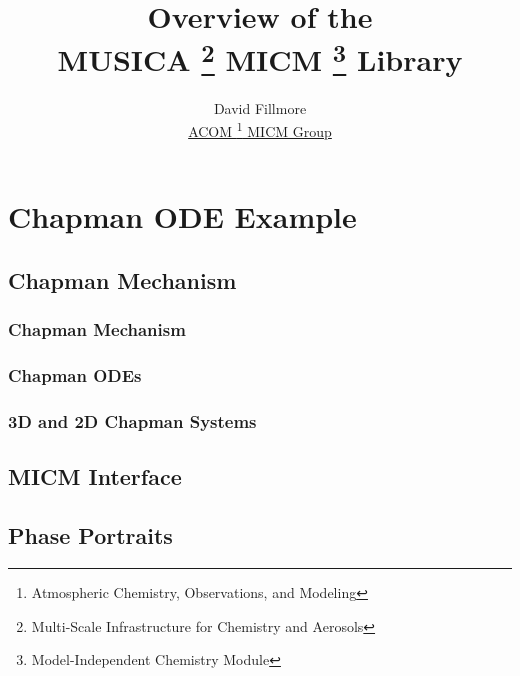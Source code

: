 \documentclass{beamer}
\title[MUSICA ODEs]{Overview of the \\
MUSICA
\footnote{Multi-Scale Infrastructure for Chemistry and Aerosols}
MICM
\footnote{Model-Independent Chemistry Module}
Library}
\author[Fillmore]{David Fillmore \\
\vspace{0.05in}
{\small \underline{ACOM
\footnote{Atmospheric Chemistry, Observations, and Modeling}
 MICM Group}}}
\begin{document}
\frame{\titlepage}

\section{Chapman ODE Example}

\subsection{Chapman Mechanism}
\begin{frame}
\frametitle{Chapman Mechanism}

\end{frame}

\begin{frame}
\frametitle{Chapman ODEs}

\end{frame}

\begin{frame}
\frametitle{3D and 2D Chapman Systems}

\end{frame}

\subsection{MICM Interface}
\begin{frame}

\end{frame}

\begin{frame}

\end{frame}

\begin{frame}

\end{frame}

\subsection{Phase Portraits}
\begin{frame}

\end{frame}

\begin{frame}

\end{frame}

\begin{frame}

\end{frame}

\begin{frame}

\end{frame}
\end{document}

